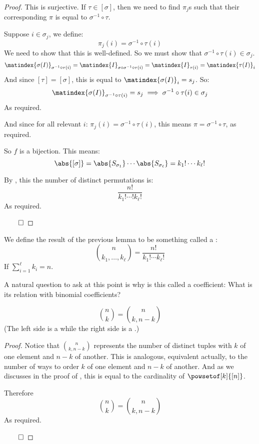 \begin{proof}
	This is surjective. If $\tau\in [\sigma]$, then we need to find $\pi_j$s such that their corresponding $\pi$ is equal to
	$\sigma^{-1}\circ\tau$.

	Suppose $i\in\sigma_j$, we define:
	\[ \pi_j(i) = \sigma^{-1}\circ\tau(i) \]
	We need to show that this is well-defined. So we must show that $\sigma^{-1}\circ\tau(i)\in\sigma_j$.
	\[ \matindex{\sigma(I)}_{\sigma^{-1}\circ\tau(i)} = \matindex{I}_{\sigma\circ\sigma^{-1}\circ\tau(i)}
	 = \matindex{I}_{\tau(i)} = \matindex{\tau(I)}_i \]
	And since $[\tau]=[\sigma]$, this is equal to $\matindex{\sigma(I)}_i=s_j$.
	So:
	\[ \matindex{\sigma(I)}_{\sigma^{-1}\circ\tau(i)} = s_j \implies \sigma^{-1}\circ\tau(i)\in\sigma_j \]
	As required.

	And since for all relevant $i$: $\pi_j(i)=\sigma^{-1}\circ\tau(i)$, this means $\pi=\sigma^{-1}\circ\tau$, as required.

	So $f$ is a bijection. This means:
	\[ \abs{[\sigma]} = \abs{S_{\sigma_1}}\cdots\abs{S_{\sigma_\ell}} = k_1!\cdots k_\ell! \]

	By , this the number of distinct permutations is:
	\[ \frac{n!}{k_1!\cdots! k_\ell!} \]
	As required.

\hfill$\qed$

\end{proof}

\newpage
\begin{defn*}

	We define the result of the previous lemma to be something called a :
	\[ \binom{n}{k_1,\dots,k_\ell} = \frac{n!}{k_1!\cdots k_\ell!} \]
	If $\sum\limits_{i=1}^\ell k_i=n$.

\end{defn*}

A natural question to ask at this point is why is this called a  coefficient:
What is its relation with binomial coefficients?

\begin{prop*}[nomialRelationProposition]

	\[ \binom{n}{k} = \binom{n}{k,n-k} \]
	(The left side is a  while the right side is a .)

\end{prop*}

\begin{proof}

	Notice that $\binom{n}{k,n-k}$ represents the number of distinct tuples with $k$ of one element and $n-k$ of another.
	This is analogous, equivalent actually, to the number of ways to order $k$ of one element and $n-k$ of another.
	And as we discusses in the proof of , this is equal to the cardinality of $\powsetof[k]{[n]}$.

	Therefore
	\[ \binom{n}{k} = \binom{n}{k,n-k} \]
	As required.

\hfill$\qed$

\end{proof}


